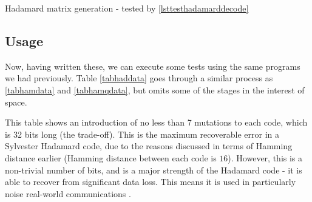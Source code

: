 \documentclass[a4paper,11pt]{article}
\newenvironment{longlisting}
{\addvspace{\baselineskip}\captionsetup{type=listing}}
{\addvspace{\baselineskip}}
\begin{document}
\begin{longlisting}
\inputminted{python}{../src/hadamard_decode.py}
\caption{Hadamard matrix generation - tested by \ref{lsttesthadamarddecode}}
\label{lsthaddecode}
\end{longlisting}

    \subsection{Usage}

    Now, having written these, we can execute some tests using the same programs
    we had previously. Table \ref{tabhaddata} goes through a similar process as
    \ref{tabhamdata} and \ref{tabhamqdata}, but omits some of the stages in the
    interest of space.

    This table shows an introduction of no less than 7 mutations to each code,
    which is 32 bits long (the trade-off). This is the maximum recoverable
    error in a Sylvester Hadamard code, due to the reasons discussed in terms of
    Hamming distance earlier (Hamming distance between each code is $16$).
    However, this is a non-trivial number of bits, and is a major strength of
    the Hadamard code - it is able to recover from significant data loss. This
    means it is used in particularly noise real-world communications
    \cite{OrthogonalCodes2002Amadei}.
\end{document}

